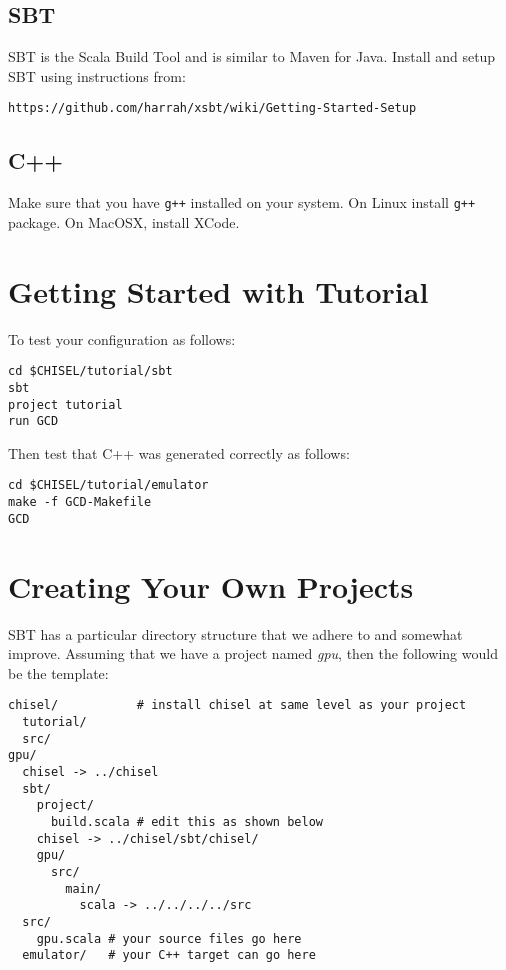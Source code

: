 \documentclass[10pt]{article}
\begin{document}
\subsection{SBT}

SBT is the Scala Build Tool and is similar to Maven for Java.  Install
and setup SBT using instructions from:

\begin{verbatim}
https://github.com/harrah/xsbt/wiki/Getting-Started-Setup
\end{verbatim}

\subsection{C++}

Make sure that you have \verb|g++| installed on your system.  On Linux
install \verb|g++| package.  On MacOSX, install XCode.

\section{Getting Started with Tutorial}

To test your configuration as follows:

\begin{verbatim}
cd $CHISEL/tutorial/sbt
sbt
project tutorial
run GCD
\end{verbatim}

\noindent
Then test that C++ was generated correctly as follows:

\begin{verbatim}
cd $CHISEL/tutorial/emulator
make -f GCD-Makefile
GCD
\end{verbatim}

\section{Creating Your Own Projects}

SBT has a particular directory structure that we adhere to and
somewhat improve.  Assuming that we have a project named {\em gpu},
then the following would be the template:

\begin{verbatim}
chisel/           # install chisel at same level as your project
  tutorial/
  src/
gpu/
  chisel -> ../chisel
  sbt/
    project/
      build.scala # edit this as shown below
    chisel -> ../chisel/sbt/chisel/
    gpu/
      src/
        main/
          scala -> ../../../../src
  src/ 
    gpu.scala # your source files go here
  emulator/   # your C++ target can go here
\end{verbatim}
\end{document}
